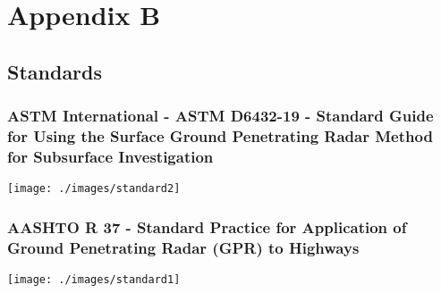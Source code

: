 \chapter{Appendix B}

\section{Standards}
\subsection{ASTM International - ASTM D6432-19 - Standard Guide for Using the Surface Ground Penetrating Radar Method for Subsurface Investigation }
\texttt{[image: ./images/standard2]}
\subsection{AASHTO R 37 - Standard Practice for Application of Ground Penetrating Radar (GPR) to Highways}
\texttt{[image: ./images/standard1]}
